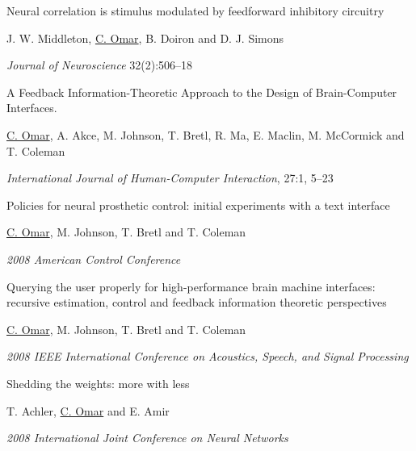 \documentclass[10pt,letterpaper]{article}
\renewenvironment{itemize}{
  \begin{list}{}{
    \setlength{\leftmargin}{1.25em}
    \setlength{\itemsep}{0.25em}
    \setlength{\parskip}{0pt}
    \setlength{\parsep}{0.2em}
  }
}{
  \end{list}
}
\begin{document}
\begin{enumerate}[leftmargin=*, labelindent=6.5em, font=\bfseries]
\begin{itemize}
        \end{itemize}
  \item[J. Neuro. 2012] {Neural correlation is stimulus modulated by feedforward inhibitory circuitry}
        \begin{itemize}
          \item J. W. Middleton, \underline{C. Omar}, B. Doiron and D. J. Simons
          \item \textit{Journal of Neuroscience} 32(2):506--18
        \end{itemize}
  \item[IJHCI 2011] A Feedback Information-Theoretic Approach to the Design of Brain-Computer Interfaces.
        \begin{itemize}
          \item  \underline{C. Omar}, A. Akce, M. Johnson, T. Bretl, R. Ma, E. Maclin, M. McCormick and T. Coleman
          \item \textit{International Journal of Human-Computer Interaction}, 27:1, 5--23
        \end{itemize}
  \item[ACC 2008] Policies for neural prosthetic control: initial experiments with a text interface
        \begin{itemize}
          \item \underline{C. Omar}, M. Johnson, T. Bretl and T. Coleman
          \item \textit{2008 American Control Conference} 
        \end{itemize}
  \item[ICASSP 2008] Querying the user properly for high-performance brain machine interfaces: recursive estimation, control and feedback information theoretic perspectives
        \begin{itemize}
          \item \underline{C. Omar}, M. Johnson, T. Bretl and T. Coleman
          \item \textit{2008 IEEE International Conference on Acoustics, Speech, and Signal Processing}
        \end{itemize}
  \item[IJCNN 2008] Shedding the weights: more with less
        \begin{itemize}
          \item T. Achler, \underline{C. Omar} and E. Amir
          \item \textit{2008 International Joint Conference on Neural Networks}
        \end{itemize}

\end{enumerate}
\end{document}

